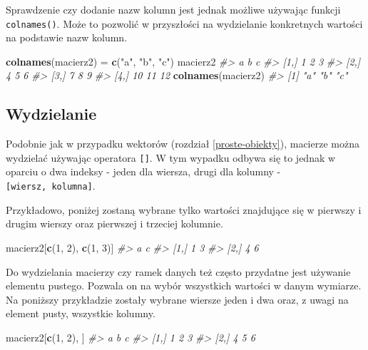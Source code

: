 \documentclass[paper=6in:9in,pagesize=pdftex,headinclude=on,footinclude=on,10pt]{scrbook}
\newenvironment{Shaded}{\begin{snugshade}}{\end{snugshade}}
\newcommand{\CommentTok}[1]{\textcolor[rgb]{0.56,0.35,0.01}{\textit{#1}}}
\newcommand{\DecValTok}[1]{\textcolor[rgb]{0.00,0.00,0.81}{#1}}
\newcommand{\KeywordTok}[1]{\textcolor[rgb]{0.13,0.29,0.53}{\textbf{#1}}}
\newcommand{\NormalTok}[1]{#1}
\newcommand{\StringTok}[1]{\textcolor[rgb]{0.31,0.60,0.02}{#1}}
\begin{document}
Sprawdzenie czy dodanie nazw kolumn jest jednak możliwe używając funkcji \texttt{colnames()}.
Może to pozwolić w przyszłości na wydzielanie konkretnych wartości na podstawie nazw kolumn.

\begin{Shaded}
\begin{Highlighting}[]
\KeywordTok{colnames}\NormalTok{(macierz2) =}\StringTok{ }\KeywordTok{c}\NormalTok{(}\StringTok{"a"}\NormalTok{, }\StringTok{"b"}\NormalTok{, }\StringTok{"c"}\NormalTok{)}
\NormalTok{macierz2}
\CommentTok{#>       a  b  c}
\CommentTok{#> [1,]  1  2  3}
\CommentTok{#> [2,]  4  5  6}
\CommentTok{#> [3,]  7  8  9}
\CommentTok{#> [4,] 10 11 12}
\KeywordTok{colnames}\NormalTok{(macierz2)}
\CommentTok{#> [1] "a" "b" "c"}
\end{Highlighting}
\end{Shaded}

\hypertarget{wydzielanie-1}{%
\subsection{Wydzielanie}\label{wydzielanie-1}}

Podobnie jak w przypadku wektorów (rozdział \ref{proste-obiekty}), macierze można wydzielać używając operatora \texttt{{[}{]}}.
W tym wypadku odbywa się to jednak w oparciu o dwa indeksy - jeden dla wiersza, drugi dla kolumny - \texttt{{[}wiersz,\ kolumna{]}}.

Przykładowo, poniżej zostaną wybrane tylko wartości znajdujące się w pierwszy i drugim wierszy oraz pierwszej i trzeciej kolumnie.

\begin{Shaded}
\begin{Highlighting}[]
\NormalTok{macierz2[}\KeywordTok{c}\NormalTok{(}\DecValTok{1}\NormalTok{, }\DecValTok{2}\NormalTok{), }\KeywordTok{c}\NormalTok{(}\DecValTok{1}\NormalTok{, }\DecValTok{3}\NormalTok{)]}
\CommentTok{#>      a c}
\CommentTok{#> [1,] 1 3}
\CommentTok{#> [2,] 4 6}
\end{Highlighting}
\end{Shaded}

Do wydzielania macierzy czy ramek danych też często przydatne jest używanie elementu pustego.
Pozwala on na wybór wszystkich wartości w danym wymiarze.
Na poniższy przykładzie zostały wybrane wiersze jeden i dwa oraz, z uwagi na element pusty, wszystkie kolumny.

\begin{Shaded}
\begin{Highlighting}[]
\NormalTok{macierz2[}\KeywordTok{c}\NormalTok{(}\DecValTok{1}\NormalTok{, }\DecValTok{2}\NormalTok{), ]}
\CommentTok{#>      a b c}
\CommentTok{#> [1,] 1 2 3}
\CommentTok{#> [2,] 4 5 6}
\end{Highlighting}
\end{Shaded}
\end{document}
